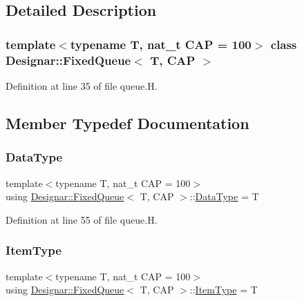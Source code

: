 \subsection{Detailed Description}
\subsubsection*{template$<$typename T, nat\+\_\+t C\+AP = 100$>$\newline
class Designar\+::\+Fixed\+Queue$<$ T, C\+A\+P $>$}



Definition at line 35 of file queue.\+H.



\subsection{Member Typedef Documentation}
\mbox{\label{class_designar_1_1_fixed_queue_a0638afcff4eb29040d4573212558da5f}} 
\subsubsection{\texorpdfstring{Data\+Type}{DataType}}
{\footnotesize\ttfamily template$<$typename T, nat\+\_\+t C\+AP = 100$>$ \\
using \hyperlink{class_designar_1_1_fixed_queue}{Designar\+::\+Fixed\+Queue}$<$ T, C\+AP $>$\+::\hyperlink{class_designar_1_1_fixed_queue_a0638afcff4eb29040d4573212558da5f}{Data\+Type} =  T}



Definition at line 55 of file queue.\+H.

\mbox{\label{class_designar_1_1_fixed_queue_aa1c356bc74a041121662af027abf279b}} 
\subsubsection{\texorpdfstring{Item\+Type}{ItemType}}
{\footnotesize\ttfamily template$<$typename T, nat\+\_\+t C\+AP = 100$>$ \\
using \hyperlink{class_designar_1_1_fixed_queue}{Designar\+::\+Fixed\+Queue}$<$ T, C\+AP $>$\+::\hyperlink{class_designar_1_1_fixed_queue_aa1c356bc74a041121662af027abf279b}{Item\+Type} =  T}



